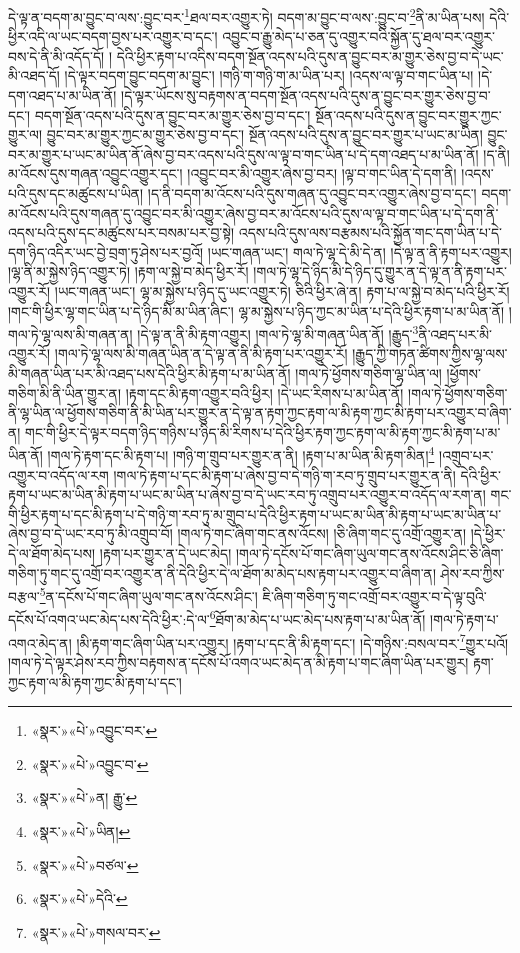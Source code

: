 དེ་ལྟ་ན་བདག་མ་བྱུང་བ་ལས་:བྱུང་བར་\footnote{«སྣར་»«པེ་»འབྱུང་བར་}ཐལ་བར་འགྱུར་ཏེ། བདག་མ་བྱུང་བ་ལས་:བྱུང་བ་\footnote{«སྣར་»«པེ་»འབྱུང་བ་}ནི་མ་ཡིན་པས། དེའི་ཕྱིར་འདི་ལ་ཡང་བདག་བྱས་པར་འགྱུར་བ་དང་། འབྱུང་བ་རྒྱུ་མེད་པ་ཅན་དུ་འགྱུར་བའི་སྐྱོན་དུ་ཐལ་བར་འགྱུར་བས་དེ་ནི་མི་འདོད་དོ། །
དེའི་ཕྱིར་རྟག་པ་འདིས་བདག་སྔོན་འདས་པའི་དུས་ན་བྱུང་བར་མ་གྱུར་ཅེས་བྱ་བ་དེ་ཡང་མི་འཐད་དོ། །དེ་ལྟར་བདག་བྱུང་བདག་མ་བྱུང་། །གཉི་ག་གཉི་ག་མ་ཡིན་པར། །འདས་ལ་ལྟ་བ་གང་ཡིན་པ། །དེ་དག་འཐད་པ་མ་ཡིན་ནོ། །དེ་ལྟར་ཡོངས་སུ་བརྟགས་ན་བདག་སྔོན་འདས་པའི་དུས་ན་བྱུང་བར་གྱུར་ཅེས་བྱ་བ་དང་། བདག་སྔོན་འདས་པའི་དུས་ན་བྱུང་བར་མ་གྱུར་ཅེས་བྱ་བ་དང་། སྔོན་འདས་པའི་དུས་ན་བྱུང་བར་གྱུར་ཀྱང་གྱུར་ལ། བྱུང་བར་མ་གྱུར་ཀྱང་མ་གྱུར་ཅེས་བྱ་བ་དང་། སྔོན་འདས་པའི་དུས་ན་བྱུང་བར་གྱུར་པ་ཡང་མ་ཡིན། བྱུང་བར་མ་གྱུར་པ་ཡང་མ་ཡིན་ནོ་ཞེས་བྱ་བར་འདས་པའི་དུས་ལ་ལྟ་བ་གང་ཡིན་པ་དེ་དག་འཐད་པ་མ་ཡིན་ནོ། །ད་ནི། མ་འོངས་དུས་གཞན་འབྱུང་འགྱུར་དང་། །འབྱུང་བར་མི་འགྱུར་ཞེས་བྱ་བར། །ལྟ་བ་གང་ཡིན་དེ་དག་ནི། །འདས་པའི་དུས་དང་མཚུངས་པ་ཡིན། །ད་ནི་བདག་མ་འོངས་པའི་དུས་གཞན་དུ་འབྱུང་བར་འགྱུར་ཞེས་བྱ་བ་དང་། བདག་མ་འོངས་པའི་དུས་གཞན་དུ་འབྱུང་བར་མི་འགྱུར་ཞེས་བྱ་བར་མ་འོངས་པའི་དུས་ལ་ལྟ་བ་གང་ཡིན་པ་དེ་དག་ནི་འདས་པའི་དུས་དང་མཚུངས་པར་བསམ་པར་བྱ་སྟེ། འདས་པའི་དུས་ལས་བརྩམས་པའི་སྐྱོན་གང་དག་ཡིན་པ་དེ་དག་ཉིད་འདིར་ཡང་བྱེ་བྲག་ཏུ་ཤེས་པར་བྱའོ། །ཡང་གཞན་ཡང་། གལ་ཏེ་ལྷ་དེ་མི་དེ་ན། །དེ་ལྟ་ན་ནི་རྟག་པར་འགྱུར། །ལྷ་ནི་མ་སྐྱེས་ཉིད་འགྱུར་ཏེ། །རྟག་ལ་སྐྱེ་བ་མེད་ཕྱིར་རོ། །གལ་ཏེ་ལྷ་དེ་ཉིད་མི་དེ་ཉིད་དུ་གྱུར་ན་དེ་ལྟ་ན་ནི་རྟག་པར་འགྱུར་རོ། །ཡང་གཞན་ཡང་། ལྷ་མ་སྐྱེས་པ་ཉིད་དུ་ཡང་འགྱུར་ཏེ། ཅིའི་ཕྱིར་ཞེ་ན། རྟག་པ་ལ་སྐྱེ་བ་མེད་པའི་ཕྱིར་རོ། །གང་གི་ཕྱིར་ལྷ་གང་ཡིན་པ་དེ་ཉིད་མི་མ་ཡིན་ཞིང་། ལྷ་མ་སྐྱེས་པ་ཉིད་ཀྱང་མ་ཡིན་པ་དེའི་ཕྱིར་རྟག་པ་མ་ཡིན་ནོ། །གལ་ཏེ་ལྷ་ལས་མི་གཞན་ན། །དེ་ལྟ་ན་ནི་མི་རྟག་འགྱུར། །གལ་ཏེ་ལྷ་མི་གཞན་ཡིན་ནོ། །རྒྱུད་\footnote{«སྣར་»«པེ་»ན། རྒྱུ་}ནི་འཐད་པར་མི་འགྱུར་རོ། །གལ་ཏེ་ལྷ་ལས་མི་གཞན་ཡིན་ན་དེ་ལྟ་ན་ནི་མི་རྟག་པར་འགྱུར་རོ། །རྒྱུད་ཀྱི་གཏན་ཚིགས་ཀྱིས་ལྷ་ལས་མི་གཞན་ཡིན་པར་མི་འཐད་པས་དེའི་ཕྱིར་མི་རྟག་པ་མ་ཡིན་ནོ། །གལ་ཏེ་ཕྱོགས་གཅིག་ལྷ་ཡིན་ལ། །ཕྱོགས་གཅིག་མི་ནི་ཡིན་གྱུར་ན། །རྟག་དང་མི་རྟག་འགྱུར་བའི་ཕྱིར། །དེ་ཡང་རིགས་པ་མ་ཡིན་ནོ། །གལ་ཏེ་ཕྱོགས་གཅིག་ནི་ལྷ་ཡིན་ལ་ཕྱོགས་གཅིག་ནི་མི་ཡིན་པར་གྱུར་ན་དེ་ལྟ་ན་རྟག་ཀྱང་རྟག་ལ་མི་རྟག་ཀྱང་མི་རྟག་པར་འགྱུར་བ་ཞིག་ན། གང་གི་ཕྱིར་དེ་ལྟར་བདག་ཉིད་གཉིས་པ་ཉིད་མི་རིགས་པ་དེའི་ཕྱིར་རྟག་ཀྱང་རྟག་ལ་མི་རྟག་ཀྱང་མི་རྟག་པ་མ་ཡིན་ནོ། །གལ་ཏེ་རྟག་དང་མི་རྟག་པ། །གཉི་ག་གྲུབ་པར་གྱུར་ན་ནི། །རྟག་པ་མ་ཡིན་མི་རྟག་མིན།\footnote{«སྣར་»«པེ་»ཡིན།} །འགྲུབ་པར་འགྱུར་བ་འདོད་ལ་རག །གལ་ཏེ་རྟག་པ་དང་མི་རྟག་པ་ཞེས་བྱ་བ་དེ་གཉི་ག་རབ་ཏུ་གྲུབ་པར་གྱུར་ན་ནི། དེའི་ཕྱིར་རྟག་པ་ཡང་མ་ཡིན་མི་རྟག་པ་ཡང་མ་ཡིན་པ་ཞེས་བྱ་བ་དེ་ཡང་རབ་ཏུ་འགྲུབ་པར་འགྱུར་བ་འདོད་ལ་རག་ན། གང་གི་ཕྱིར་རྟག་པ་དང་མི་རྟག་པ་དེ་གཉི་ག་རབ་ཏུ་མ་གྲུབ་པ་དེའི་ཕྱིར་རྟག་པ་ཡང་མ་ཡིན་མི་རྟག་པ་ཡང་མ་ཡིན་པ་ཞེས་བྱ་བ་དེ་ཡང་རབ་ཏུ་མི་འགྲུབ་བོ། །གལ་ཏེ་གང་ཞིག་གང་ནས་འོངས། །ཅི་ཞིག་གང་དུ་འགྲོ་འགྱུར་ན། །དེ་ཕྱིར་དེ་ལ་ཐོག་མེད་པས། །རྟག་པར་གྱུར་ན་དེ་ཡང་མེད། །གལ་ཏེ་དངོས་པོ་གང་ཞིག་ཡུལ་གང་ནས་འོངས་ཤིང་ཅི་ཞིག་གཅིག་ཏུ་གང་དུ་འགྲོ་བར་འགྱུར་ན་ནི་དེའི་ཕྱིར་དེ་ལ་ཐོག་མ་མེད་པས་རྟག་པར་འགྱུར་བ་ཞིག་ན། ཤེས་རབ་ཀྱིས་བརྩལ་\footnote{«སྣར་»«པེ་»བཙལ་}ན་དངོས་པོ་གང་ཞིག་ཡུལ་གང་ནས་འོངས་ཤིང་། ཇི་ཞིག་གཅིག་ཏུ་གང་འགྲོ་བར་འགྱུར་བ་དེ་ལྟ་བུའི་དངོས་པོ་འགའ་ཡང་མེད་པས་དེའི་ཕྱིར་:དེ་ལ་\footnote{«སྣར་»«པེ་»དེའི་}ཐོག་མ་མེད་པ་ཡང་མེད་པས་རྟག་པ་མ་ཡིན་ནོ། །གལ་ཏེ་རྟག་པ་འགའ་མེད་ན། །མི་རྟག་གང་ཞིག་ཡིན་པར་འགྱུར། །རྟག་པ་དང་ནི་མི་རྟག་དང་། །དེ་གཉིས་:བསལ་བར་\footnote{«སྣར་»«པེ་»གསལ་བར་}གྱུར་པའོ། །གལ་ཏེ་དེ་ལྟར་ཤེས་རབ་ཀྱིས་བརྟགས་ན་དངོས་པོ་འགའ་ཡང་མེད་ན་མི་རྟག་པ་གང་ཞིག་ཡིན་པར་གྱུར། རྟག་ཀྱང་རྟག་ལ་མི་རྟག་ཀྱང་མི་རྟག་པ་དང་། 